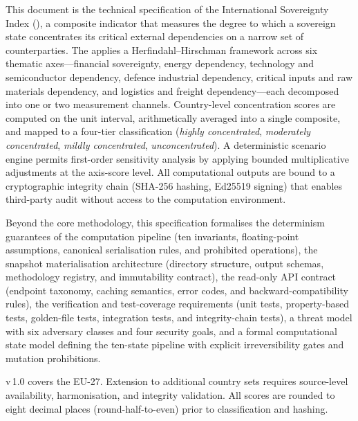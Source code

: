 This document is the technical specification of the International Sovereignty
Index (\ISI), a composite indicator that measures the degree to which a
sovereign state concentrates its critical external dependencies on a narrow set
of counterparties.  The \ISI applies a Herfindahl--Hirschman framework across
six thematic axes---financial sovereignty, energy dependency, technology and
semiconductor dependency, defence industrial dependency, critical inputs and
raw materials dependency, and logistics and freight dependency---each
decomposed into one or two measurement channels.  Country-level concentration
scores are computed on the unit interval, arithmetically averaged into a
single composite, and mapped to a four-tier classification (\emph{highly
concentrated}, \emph{moderately concentrated}, \emph{mildly concentrated},
\emph{unconcentrated}).  A deterministic scenario engine permits first-order
sensitivity analysis by applying bounded multiplicative adjustments at the
axis-score level.  All computational outputs are bound to a cryptographic
integrity chain (SHA-256 hashing, Ed25519 signing) that enables third-party
audit without access to the computation environment.

Beyond the core methodology, this specification formalises the determinism
guarantees of the computation pipeline (ten invariants, floating-point
assumptions, canonical serialisation rules, and prohibited operations), the
snapshot materialisation architecture (directory structure, output schemas,
methodology registry, and immutability contract), the read-only API contract
(endpoint taxonomy, caching semantics, error codes, and backward-compatibility
rules), the verification and test-coverage requirements (unit tests,
property-based tests, golden-file tests, integration tests, and
integrity-chain tests), a threat model with six adversary classes and four
security goals, and a formal computational state model defining the
ten-state pipeline with explicit irreversibility gates and mutation
prohibitions.

\ISI v\,1.0 covers the EU-27.  Extension to additional country sets requires
source-level availability, harmonisation, and integrity validation.  All
scores are rounded to eight decimal places (round-half-to-even) prior to
classification and hashing.
